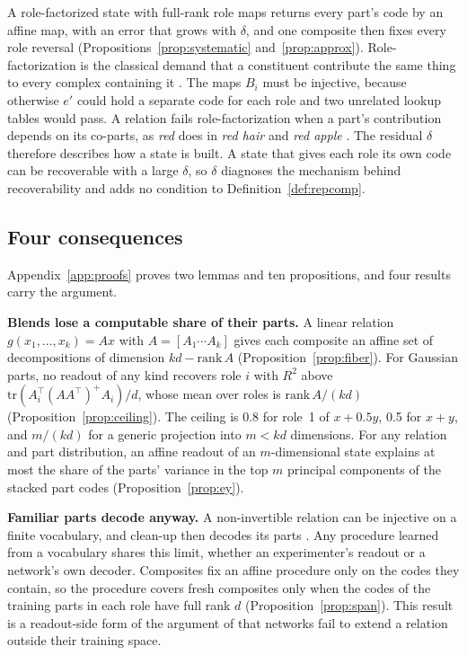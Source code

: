 \documentclass[10pt]{article}
\theoremstyle{plain}
\theoremstyle{remark}
\begin{document}
A role-factorized state with full-rank role maps returns every part's code by an affine map, with an error that grows with $\delta$, and one composite then fixes every role reversal (Propositions~\ref{prop:systematic} and~\ref{prop:approx}). Role-factorization is the classical demand that a constituent contribute the same thing to every complex containing it \citep{fodor1988}. The maps $B_i$ must be injective, because otherwise $e'$ could hold a separate code for each role and two unrelated lookup tables would pass. A relation fails role-factorization when a part's contribution depends on its co-parts, as \emph{red} does in \emph{red hair} and \emph{red apple} \citep{kamp1995}. The residual $\delta$ therefore describes how a state is built. A state that gives each role its own code can be recoverable with a large $\delta$, so $\delta$ diagnoses the mechanism behind recoverability and adds no condition to Definition~\ref{def:repcomp}.

\subsection{Four consequences}
\label{sec:consequences}

Appendix~\ref{app:proofs} proves two lemmas and ten propositions, and four results carry the argument.

\textbf{Blends lose a computable share of their parts.} A linear relation $g(x_1, \ldots, x_k) = A x$ with $A = [A_1 \cdots A_k]$ gives each composite an affine set of decompositions of dimension $kd - \mathrm{rank}\,A$ (Proposition~\ref{prop:fiber}). For Gaussian parts, no readout of any kind recovers role $i$ with $R^2$ above $\mathrm{tr}(A_i^{\top}(AA^{\top})^{+}A_i)/d$, whose mean over roles is $\mathrm{rank}\,A/(kd)$ (Proposition~\ref{prop:ceiling}). The ceiling is 0.8 for role~1 of $x + 0.5y$, 0.5 for $x + y$, and $m/(kd)$ for a generic projection into $m < kd$ dimensions. For any relation and part distribution, an affine readout of an $m$-dimensional state explains at most the share of the parts' variance in the top $m$ principal components of the stacked part codes (Proposition~\ref{prop:ey}).

\textbf{Familiar parts decode anyway.} A non-invertible relation can be injective on a finite vocabulary, and clean-up then decodes its parts \citep{plate2003,frady2018}. Any procedure learned from a vocabulary shares this limit, whether an experimenter's readout or a network's own decoder. Composites fix an affine procedure only on the codes they contain, so the procedure covers fresh composites only when the codes of the training parts in each role have full rank $d$ (Proposition~\ref{prop:span}). This result is a readout-side form of the argument of \citet{marcus1998} that networks fail to extend a relation outside their training space.
\end{document}
